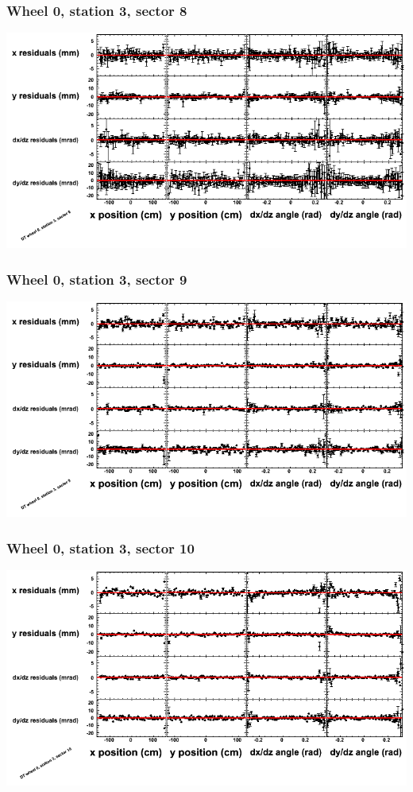 \documentclass[compress]{beamer}
\begin{document}
\begin{frame}
\frametitle{Wheel 0, station 3, sector 8}
\includegraphics[width=\linewidth]{tmppoly_MBwhCst3sec08.png}
\end{frame}

\begin{frame}
\frametitle{Wheel 0, station 3, sector 9}
\includegraphics[width=\linewidth]{tmppoly_MBwhCst3sec09.png}
\end{frame}

\begin{frame}
\frametitle{Wheel 0, station 3, sector 10}
\includegraphics[width=\linewidth]{tmppoly_MBwhCst3sec10.png}
\end{frame}
\end{document}
